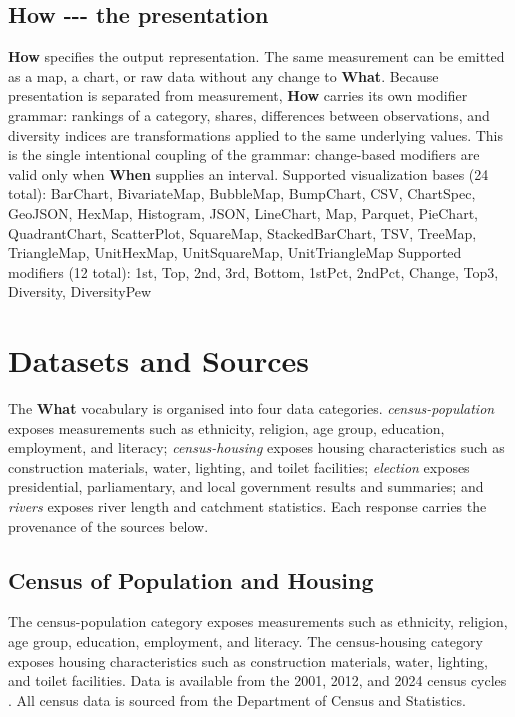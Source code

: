 \documentclass[10pt,a4paper]{article}%
\begin{document}
\subsection{How {-}{-}{-} the presentation}%
\label{subsec:How{-}{-}{-}thepresentation}%
\textbf{How} specifies the output representation. The same measurement can be emitted as a map, a chart, or raw data without any change to \textbf{What}. Because presentation is separated from measurement, \textbf{How} carries its own modifier grammar: rankings of a category, shares, differences between observations, and diversity indices are transformations applied to the same underlying values. This is the single intentional coupling of the grammar: change-based modifiers are valid only when \textbf{When} supplies an interval.%
Supported visualization bases (24 total):
BarChart, BivariateMap, BubbleMap, BumpChart, CSV, ChartSpec, GeoJSON, HexMap, Histogram, JSON, LineChart, Map, Parquet, PieChart, QuadrantChart, ScatterPlot, SquareMap, StackedBarChart, TSV, TreeMap, TriangleMap, UnitHexMap, UnitSquareMap, UnitTriangleMap%
Supported modifiers (12 total):
1st, Top, 2nd, 3rd, Bottom, 1stPct, 2ndPct, Change, Top3, Diversity, DiversityPew

%
\section{Datasets and Sources}%
\label{sec:DatasetsandSources}%
The \textbf{What} vocabulary is organised into four data categories. \emph{census-population} exposes measurements such as ethnicity, religion, age group, education, employment, and literacy; \emph{census-housing} exposes housing characteristics such as construction materials, water, lighting, and toilet facilities; \emph{election} exposes presidential, parliamentary, and local government results and summaries; and \emph{rivers} exposes river length and catchment statistics. Each response carries the provenance of the sources below.%
\subsection{Census of Population and Housing}%
\label{subsec:CensusofPopulationandHousing}%
The census-population category exposes measurements such as ethnicity, religion, age group, education, employment, and literacy. The census-housing category exposes housing characteristics such as construction materials, water, lighting, and toilet facilities. Data is available from the 2001, 2012, and 2024 census cycles \citep{census_2024}. All census data is sourced from the Department of Census and Statistics.
\end{document}
